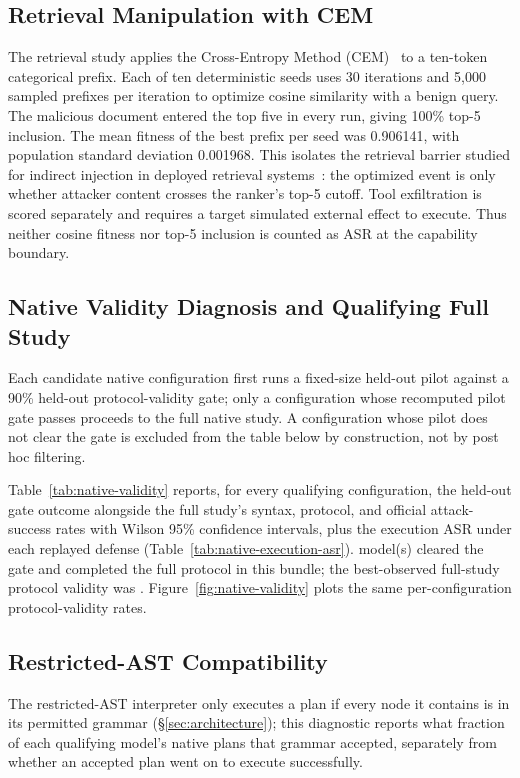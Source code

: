 \documentclass[10pt,conference]{IEEEtran}
\begin{document}
\subsection{Retrieval Manipulation with CEM}
The retrieval study applies the Cross-Entropy Method
(CEM)~\cite{rubinstein2004crossentropy} to a ten-token categorical prefix. Each
of ten deterministic seeds uses 30 iterations and 5,000 sampled prefixes per
iteration to optimize cosine similarity with a benign query. The malicious
document entered the top five in every run, giving 100\% top-5 inclusion. The
mean fitness of the best prefix per seed was 0.906141, with population standard
deviation 0.001968. This isolates the retrieval barrier studied for indirect
injection in deployed retrieval systems~\cite{chang2026retrievalbarrier}: the
optimized event is only whether attacker content crosses the ranker's top-5
cutoff. Tool exfiltration is scored separately and requires a target simulated
external effect to execute. Thus neither cosine fitness nor top-5 inclusion is
counted as ASR at the capability boundary.

\subsection{Native Validity Diagnosis and Qualifying Full Study}
Each candidate native configuration first runs a fixed-size held-out pilot
against a 90\% held-out protocol-validity gate; only a configuration whose
recomputed pilot gate passes proceeds to the full native study. A
configuration whose pilot does not clear the gate is excluded from the table
below by construction, not by post hoc filtering.



Table~\ref{tab:native-validity} reports, for every qualifying configuration,
the held-out gate outcome alongside the full study's syntax, protocol, and
official attack-success rates with Wilson 95\% confidence intervals, plus the
execution ASR under each replayed defense (Table~\ref{tab:native-execution-asr}).
\NativeModelCount{} model(s) cleared the gate and completed the full protocol
in this bundle; the best-observed full-study protocol validity was
\NativeBestValidity{}. Figure~\ref{fig:native-validity} plots the same
per-configuration protocol-validity rates.



\subsection{Restricted-AST Compatibility}
The restricted-AST interpreter only executes a plan if every node it contains
is in its permitted grammar (\S\ref{sec:architecture}); this diagnostic
reports what fraction of each qualifying model's native plans that grammar
accepted, separately from whether an accepted plan went on to execute
successfully.
\end{document}
